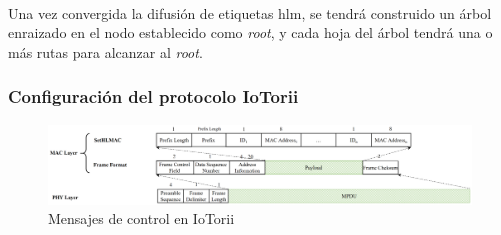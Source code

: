 \\
Una vez convergida la difusión de etiquetas \gls{hlm}, se tendrá construido un árbol enraizado en el nodo establecido como \textit{root}, y cada hoja del árbol tendrá una o más rutas para alcanzar al \textit{root}.

\newpage




\subsubsection{Configuración del protocolo IoTorii}

\begin{figure}
    \centering
    \includegraphics[width=\textwidth]{archivos/img/analisis/Comparation_frame_iotorii.eps}
    \caption{Mensajes de control en IoTorii \cite{rojas2021outperforming}}
    \label{fig:frameformat-setHLMAC}
\end{figure}